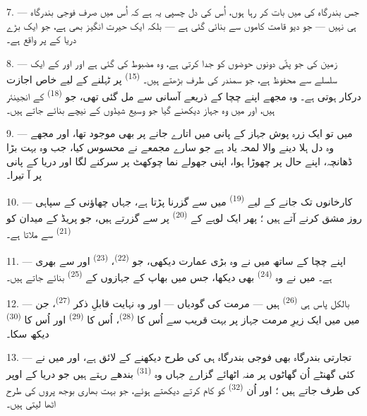 \VUsaut{3.0mm}
\VUsaut{3.0mm}

7. --- جس بندرگاہ کی میں بات کر رہا ہوں، اُس کی دل چسپی یہ ہے کہ اُس
میں صرف فوجی بندرگاہ ہی نہیں — جو دیو قامت کاموں سے بنائی گئی ہے —
بلکہ ایک حیرت انگیز  بھی ہے، جو ایک بڑے دریا
کے  پر واقع ہے۔

8. --- زمین کی جو پٹّی دونوں حوضوں کو جدا کرتی ہے، وہ مضبوط کی گئی
ہے اور  اور  کے ایک سلسلے سے محفوظ
ہے، جو سمندر کی طرف بڑھتے ہیں۔  \textsuperscript{(15)}
پر ٹہلنے کے لیے خاص اجازت درکار ہوتی ہے۔ وہ مجھے اپنے چچا کے ذریعے
آسانی سے مل گئی تھی، جو 
\textsuperscript{(18)} کے انجینئر ہیں، اور میں وہ جہاز دیکھنے گیا جو
وسیع شیڈوں کے نیچے بنائے جاتے ہیں۔

9. --- میں تو ایک زرہ پوش جہاز کے پانی میں اتارے جانے پر بھی موجود
تھا، اور مجھے وہ دل ہلا دینے والا لمحہ یاد ہے جو سارے مجمعے نے محسوس
کیا، جب وہ بہت بڑا ڈھانچہ، اپنے حال پر چھوڑا ہوا، اپنی جھولے نما
چوکھٹ پر سرکنے لگا اور دریا کے پانی پر آ تیرا۔

10. --- کارخانوں تک جانے کے لیے 
\textsuperscript{(19)} میں سے گزرنا پڑتا ہے، جہاں چھاؤنی کے سپاہی روز
مشق کرنے آتے ہیں ؛ پھر ایک لوہے کے 
\textsuperscript{(20)} پر سے گزرتے ہیں، جو پریڈ کے میدان کو
 \textsuperscript{(21)} سے ملاتا ہے۔

\VUsaut{3.0mm}
\VUsaut{3.0mm}

11. --- اپنے چچا کے ساتھ میں نے وہ بڑی عمارت دیکھی، جو
 \textsuperscript{(22)}، 
\textsuperscript{(23)} اور  سے بھری ہے۔ میں نے
وہ  \textsuperscript{(24)} بھی دیکھا، جس میں
بھاپ کے جہازوں کے  \textsuperscript{(25)} بنائے جاتے
ہیں۔

12. --- بالکل پاس ہی  \textsuperscript{(26)} ہیں —
مرمت کی گودیاں — اور وہ نہایت قابلِ ذکر 
\textsuperscript{(27)}، جن میں میں ایک زیرِ مرمت جہاز پر بہت قریب سے
اُس کا  \textsuperscript{(28)}، اُس کا 
\textsuperscript{(29)} اور اُس کا  \textsuperscript{(30)}
دیکھ سکا۔

13. --- تجارتی بندرگاہ بھی فوجی بندرگاہ ہی کی طرح دیکھنے کے لائق
ہے، اور میں نے کئی گھنٹے اُن گھاٹوں پر منہ اٹھائے گزارے جہاں وہ
 \textsuperscript{(31)} بندھے رہتے ہیں جو دریا
کے اوپر کی طرف جاتے ہیں ؛ اور اُن 
\textsuperscript{(32)} کو کام کرتے دیکھتے ہوئے، جو بہت بھاری بوجھ پروں
کی طرح اٹھا لیتی ہیں۔

